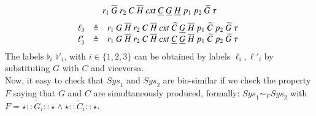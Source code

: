 {\[\begin{array}{lcl@{\hspace{0.3cm}} lcl}
r_1~\overline{G}~r_2~C~\overline{H}~\mathit{cxt}~\underline{C}~\underline{G}~\underline{H}~p_1~p_2~\widetilde{G}~\silent
\end{array}
\]
\[
\begin{array}{lcl @{\hspace{0.3cm}}lcl}
\ell_3 & \defeq & 
r_1~G~\overline{H}~r_2~C~\overline{H}~\mathit{cxt}~\widehat{C}~\underline{G}~\overline{H}~p_1~\widetilde{C}~p_2~\widetilde{G}~\silent
\\
\ell'_3 & \defeq & r_1~G~\overline{H}~r_2~C~\overline{H}~\mathit{cxt}~\underline{C}~\underline{G}~\overline{H}~p_1~\widetilde{C}~p_2~\widetilde{G}~\silent
\end{array}
\]
}
The labels $\flat_i$ $\flat'_i$, with $i \in \{1,2,3\}$ can be obtained by labels $\ell_i,\ell'_i$ by substituting $G$ with $C$ and viceversa.
\\
Now, it easy to check that $\mathit{Sys}_1$ and $\mathit{Sys}_2$ are bio-similar if we check the property $F$ saying that $G$ and $C$ are simultaneously  produced,
formally:
$\mathit{Sys}_1 \sim_F \mathit{Sys}_2$ with $F= \star :: \widetilde{G}_i :: \star \wedge  \star :: \widetilde{C}_i :: \star $.

